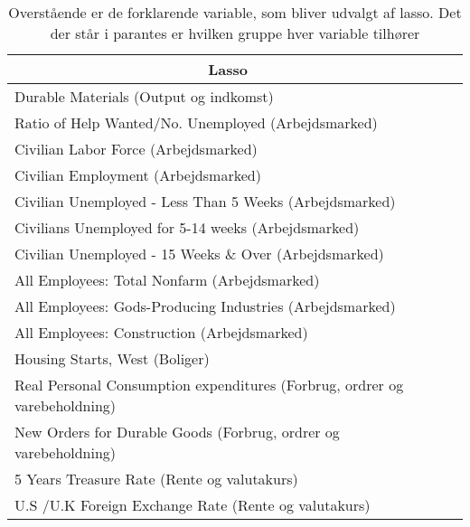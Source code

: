 \begin{table}
\small
\center
\begin{tabular}{lcc}
\toprule
\multicolumn{2}{c}{Lasso} \\ \midrule
Durable Materials (Output og indkomst) & \\
Ratio of Help Wanted/No. Unemployed (Arbejdsmarked) & \\
Civilian Labor Force (Arbejdsmarked)  & \\
Civilian Employment  (Arbejdsmarked) & \\
Civilian Unemployed - Less Than 5 Weeks (Arbejdsmarked)  & \\
Civilians Unemployed for 5-14 weeks (Arbejdsmarked) & \\
Civilian Unemployed - 15 Weeks \& Over (Arbejdsmarked) & \\
All Employees: Total Nonfarm (Arbejdsmarked) &\\
All Employees: Gods-Producing Industries (Arbejdsmarked) & \\
All Employees: Construction (Arbejdsmarked) & \\
Housing Starts, West (Boliger) & \\
Real Personal Consumption expenditures (Forbrug, ordrer og varebeholdning) &\\
New Orders for Durable Goods (Forbrug, ordrer og varebeholdning)  & \\
5 Years Treasure Rate (Rente og valutakurs) &\\
U.S /U.K Foreign Exchange Rate  (Rente og valutakurs)  & \\ \bottomrule
\end{tabular}
\caption{Overstående er de forklarende variable, som bliver udvalgt af lasso. Det der står i parantes er hvilken gruppe hver variable tilhører} \label{tab: lasso_ud}
\end{table}
